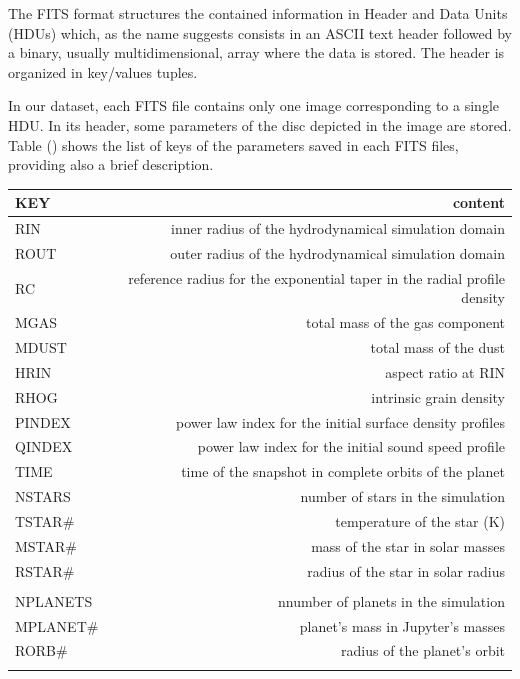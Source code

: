 \documentclass[a4paper,10pt]{report}
\begin{document}
The FITS format structures the contained information in Header and Data Units (HDUs)
which, as the name suggests consists in an ASCII text header followed by a binary, usually multidimensional, array where the data is stored.
The header is organized in key/values tuples.

In our dataset, each FITS file contains only one image corresponding to a single HDU.
In its header, some parameters of the disc depicted in the image are stored. 
Table () shows the list of keys of the parameters saved in each FITS files, providing also
a brief description.

\begin{table}
    \begin{center}
        \begin{tabular}{l r}
        \toprule
        KEY & content \\
        \midrule   
        RIN & inner radius of the hydrodynamical simulation domain\\
        ROUT & outer radius of the hydrodynamical simulation domain\\
        RC & reference radius for the exponential taper in the radial profile density\\ 
        MGAS & total mass of the gas component\\
        MDUST & total mass of the dust\\
        HRIN & aspect ratio at RIN \\ 
        RHOG & intrinsic grain density\\ 
        PINDEX & power law index for the initial surface density profiles\\
        QINDEX & power law index for the initial sound speed profile \\
        TIME & time of the snapshot in complete orbits of the planet \\

        NSTARS & number of stars in the simulation \\
        TSTAR\# & temperature of the star (K)\\
        MSTAR\# & mass of the star in solar masses \\
        RSTAR\# & radius of the star in solar radius \\ \\
        
        NPLANETS & nnumber of planets in the simulation\\
        MPLANET\# & planet's mass in Jupyter's masses \\
        RORB\# & radius of the planet's orbit\\ \\
        

\end{tabular}
\end{center}
\end{table}
\end{document}
